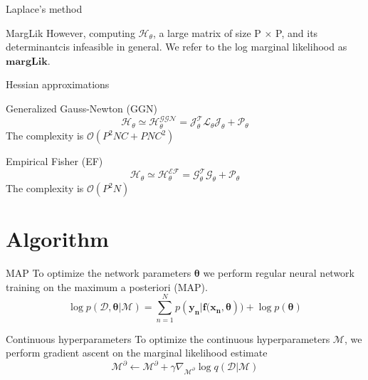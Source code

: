 \documentclass{beamer}
\begin{document}
\begin{frame}{Laplace’s method}
    \begin{block}{MargLik}
    However, computing $\boldsymbol{\mathcal{H_{\theta}}}$, a large matrix of size P × P, and its determinantcis infeasible in general. We refer to the log marginal likelihood as $\boldsymbol{margLik}$.
    \end{block} 
\end{frame}

\begin{frame}{Hessian approximations}
    \begin{block}{Generalized Gauss-Newton (GGN)}
        \begin{equation}
        \boldsymbol{\mathcal{H_{\theta}}}\simeq \boldsymbol{\mathcal{H_{\theta}^{GGN}}}
        =\boldsymbol{\mathcal{J_{\theta}^{T}}}\boldsymbol{\mathcal{L_{\theta}}}
        \boldsymbol{\mathcal{J_{\theta}}}+\boldsymbol{\mathcal{P_{\theta}}}
        \end{equation}
        The complexity is $\mathcal{O}(P^{2}NC + PNC^{2})$
    \end{block}
    \begin{block}{Empirical Fisher (EF)}
        \begin{equation}
        \boldsymbol{\mathcal{H_{\theta}}}\simeq \boldsymbol{\mathcal{H_{\theta}^{EF}}}
        =\boldsymbol{\mathcal{G_{\theta}^{T}}}
        \boldsymbol{\mathcal{G_{\theta}}}+\boldsymbol{\mathcal{P_{\theta}}}
        \end{equation}
        The complexity is $\mathcal{O}(P^{2}N)$
    \end{block} 
\end{frame}

\section{Algorithm}
\begin{frame}{}
    \begin{block}{MAP}
        To optimize the network parameters $\boldsymbol{\theta}$ we perform regular neural network training on the maximum a posteriori (MAP).
        \begin{equation}
        \log p(\mathcal{D},\boldsymbol{\theta}|\mathcal{M})=\sum_{n=1}^{N}p(\boldsymbol{y_{n}}|\boldsymbol{f}\boldsymbol{(x_{n}}, \boldsymbol{\theta})) + \log p(\boldsymbol{\theta})
        \end{equation}
    \end{block}
    \begin{block}{Continuous hyperparameters}
        To optimize the continuous hyperparameters $\mathcal{M}$, we perform gradient ascent on the marginal likelihood estimate
        \begin{equation}
        \mathcal{M}^{\partial}\gets \mathcal{M}^{\partial} + \gamma \nabla_{\mathcal{M}^{\partial}} \log q(\mathcal{D}|\mathcal{M})
        \end{equation}
    \end{block} 
\end{frame}
\end{document}
